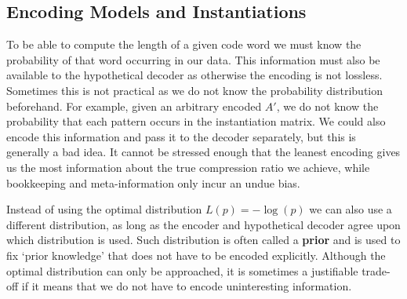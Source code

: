 \documentclass{llncs}
\begin{document}

\subsection{Encoding Models and Instantiations}
To be able to compute the length of a given code word we must know the probability of that word occurring in our data. This information must also be available to the hypothetical decoder as otherwise the encoding is not lossless. Sometimes this is not practical as we do not know the probability distribution beforehand. For example, given an arbitrary encoded $A'$, we do not know the probability that each pattern occurs in the instantiation matrix. We could also encode this information and pass it to the decoder separately, but this is generally a bad idea. It cannot be stressed enough that the leanest encoding gives us the most information about the true compression ratio we achieve, while bookkeeping and meta-information only incur an undue bias. 

Instead of using the optimal distribution $L(p)=-\log(p)$ we can also use a different distribution, as long as the encoder and hypothetical decoder agree upon which distribution is used. Such distribution is often called a \textbf{prior} and is used to fix `prior knowledge' that does not have to be encoded explicitly. Although the optimal distribution can only be approached, it is sometimes a justifiable trade-off if it means that we do not have to encode uninteresting information.  
\end{document}
